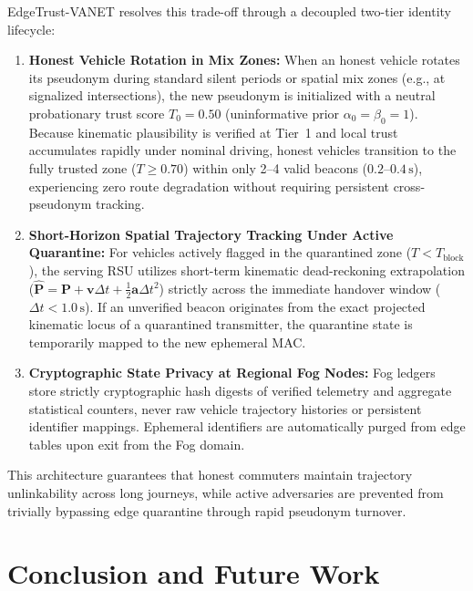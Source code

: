 \documentclass[conference]{IEEEtran}
\begin{document}
EdgeTrust-VANET resolves this trade-off through a decoupled two-tier identity lifecycle:
\begin{enumerate}
    \item \textbf{Honest Vehicle Rotation in Mix Zones:} When an honest vehicle rotates its pseudonym during standard silent periods or spatial mix zones (e.g., at signalized intersections), the new pseudonym is initialized with a neutral probationary trust score $T_0 = 0.50$ (uninformative prior $\alpha_0 = \beta_0 = 1$). Because kinematic plausibility is verified at Tier~1 and local trust accumulates rapidly under nominal driving, honest vehicles transition to the fully trusted zone ($T \ge 0.70$) within only 2--4 valid beacons ($0.2\text{--}0.4\,\text{s}$), experiencing zero route degradation without requiring persistent cross-pseudonym tracking.
    \item \textbf{Short-Horizon Spatial Trajectory Tracking Under Active Quarantine:} For vehicles actively flagged in the quarantined zone ($T < T_{\text{block}}$), the serving RSU utilizes short-term kinematic dead-reckoning extrapolation ($\hat{\mathbf{P}} = \mathbf{P} + \mathbf{v}\Delta t + \frac{1}{2}\mathbf{a}\Delta t^2$) strictly across the immediate handover window ($\Delta t < 1.0\,\text{s}$). If an unverified beacon originates from the exact projected kinematic locus of a quarantined transmitter, the quarantine state is temporarily mapped to the new ephemeral MAC. 
    \item \textbf{Cryptographic State Privacy at Regional Fog Nodes:} Fog ledgers store strictly cryptographic hash digests of verified telemetry and aggregate statistical counters, never raw vehicle trajectory histories or persistent identifier mappings. Ephemeral identifiers are automatically purged from edge tables upon exit from the Fog domain.
\end{enumerate}
This architecture guarantees that honest commuters maintain trajectory unlinkability across long journeys, while active adversaries are prevented from trivially bypassing edge quarantine through rapid pseudonym turnover.


\section{Conclusion and Future Work}
\end{document}
